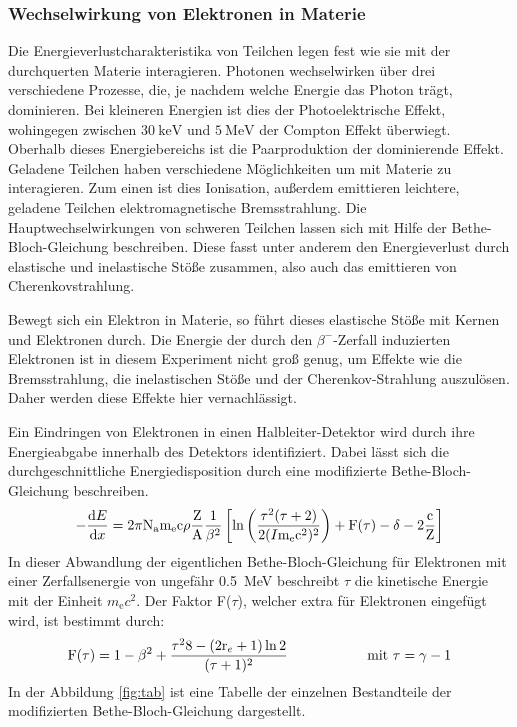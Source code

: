 \subsubsection{Wechselwirkung von Elektronen in Materie}
Die Energieverlustcharakteristika von Teilchen legen fest wie sie mit der durchquerten Materie interagieren. Photonen wechselwirken über drei verschiedene Prozesse, die, je nachdem welche Energie das Photon trägt, dominieren. Bei kleineren Energien ist dies der Photoelektrische Effekt, wohingegen zwischen $\SI{30}{\kilo\electronvolt}$ und $\SI{5}{\mega\electronvolt}$ der Compton Effekt überwiegt. Oberhalb dieses Energiebereichs ist die Paarproduktion der dominierende Effekt. Geladene Teilchen haben verschiedene Möglichkeiten um mit Materie zu interagieren. Zum einen ist dies Ionisation, außerdem emittieren leichtere, geladene Teilchen elektromagnetische Bremsstrahlung. Die Hauptwechselwirkungen von schweren Teilchen lassen sich mit Hilfe der Bethe-Bloch-Gleichung beschreiben. Diese fasst unter anderem den Energieverlust durch elastische und inelastische Stöße zusammen, also auch das emittieren von Cherenkovstrahlung.

Bewegt sich ein Elektron in Materie, so führt dieses elastische Stöße mit Kernen und Elektronen durch. Die Energie der durch den $\beta^{-}$-Zerfall induzierten Elektronen ist in diesem Experiment nicht groß genug, um Effekte wie die Bremsstrahlung, die inelastischen Stöße und der Cherenkov-Strahlung auszulösen. Daher werden diese Effekte hier vernachlässigt.

Ein Eindringen von Elektronen in einen Halbleiter-Detektor wird durch ihre Energieabgabe innerhalb des Detektors identifiziert. Dabei lässt sich die durchgeschnittliche Energiedisposition durch eine modifizierte Bethe-Bloch-Gleichung beschreiben.
\begin{equation*}
  -\frac{\text{d}E}{\text{d}x} =
  2\pi \text{N}_\text{a} \text{m}_\text{e} \text{c}\rho \frac{\text{Z}}{\text{A}}\frac{1}{\beta^2}
  \left[\text{ln}\left(\frac{\tau^2(\tau + 2)}{2(I\/\text{m}_\text{e}\text{c}^2)^2}\right)
  + \text{F}(\tau) - \delta - 2\frac{\text{c}}{\text{Z}}\right]
	\label{eq:12}
\end{equation*}
In dieser Abwandlung der eigentlichen Bethe-Bloch-Gleichung für Elektronen mit einer Zerfallsenergie von ungefähr \SI{0.5}{\mega\electronvolt} beschreibt $\tau$ die kinetische Energie mit der Einheit $m_\text{e} c^2$. Der Faktor F($\tau$), welcher extra für Elektronen eingefügt wird, ist bestimmt durch:
\begin{equation*}
  \text{F}(\tau) = 1 - \beta^2 + \frac{\tau^2\/8 - (2\text{r}_e + 1) \ln2}{(\tau + 1)^2}
  \hspace{2cm}\text{mit } \tau = \gamma - 1
\end{equation*}
In der Abbildung \ref{fig:tab} ist eine Tabelle der einzelnen Bestandteile der modifizierten Bethe-Bloch-Gleichung dargestellt.

